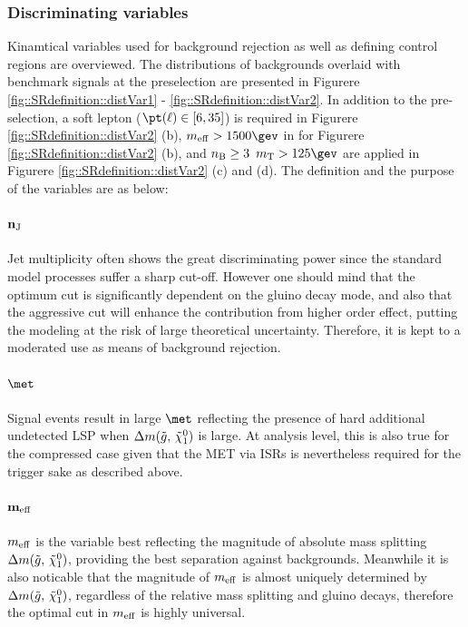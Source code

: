 \clearpage
\subsubsection{Discriminating variables}
Kinamtical variables used for background rejection as well as defining control regions are overviewed. The distributions of backgrounds overlaid with benchmark signals at the preselection are presented in Figurere \ref{fig::SRdefinition::distVar1} - \ref{fig::SRdefinition::distVar2}. In addition to the pre-selection, a soft lepton ($\pt(\ell)\in[6,35]$) is required in Figurere \ref{fig::SRdefinition::distVar2} (b), $\meffInc>1500\gev$ in for Figurere \ref{fig::SRdefinition::distVar2} (b), and $\nBJetNoGev \geq3 \,\,\, \mt>125\gev$ are applied in Figurere \ref{fig::SRdefinition::distVar2} (c) and (d). The definition and the purpose of the variables are as below: \\

\paragraph{${\bf n_{\mathrm{J}}}$}
Jet multiplicity often shows the great discriminating power since the standard model processes suffer a sharp cut-off.
However one should mind that the optimum cut is significantly dependent on the gluino decay mode, and also that the aggressive cut will enhance the contribution from higher order effect, putting the modeling at the risk of large theoretical uncertainty.
Therefore, it is kept to a moderated use as means of background rejection. \\

\paragraph{${\bf \met}$}
Signal events result in large $\met$ reflecting the presence of hard additional undetected LSP when $\Delta m(\tilde{g}, \, \tilde{\chi}_{1}^{0})$ is large.
At analysis level, this is also true for the compressed case given that the MET via ISRs is nevertheless required for the trigger sake as described above.

\paragraph{${\bf m_{\mathrm{eff}}}$} 
$m_{\mathrm{eff}}$ is the variable best reflecting the magnitude of absolute mass splitting $\Delta m(\tilde{g}, \, \tilde{\chi}_{1}^{0})$, providing the best separation against backgrounds.
Meanwhile it is also noticable that the magnitude of $m_{\mathrm{eff}}$ is almost uniquely determined by $\Delta m(\tilde{g}, \, \tilde{\chi}_{1}^{0})$, regardless of the relative mass splitting and gluino decays, 
therefore the optimal cut in $m_{\mathrm{eff}}$ is highly universal.


